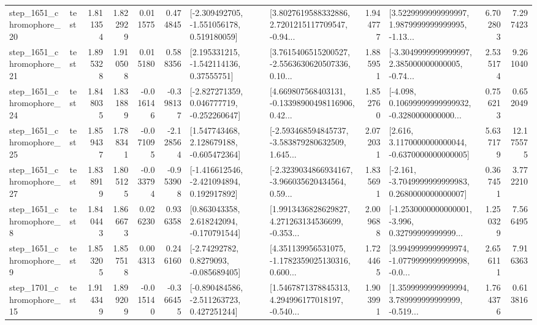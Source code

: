 \begin{tabular}{llrrrrllrlrr}
 step\_1651\_chromophore\_20 &      test &      1.811354 &    1.822929 &      0.011575 &  0.474845 &   [-2.309492705, -1.551056178, 0.519180059] &  [3.8027619588332886, 2.7201215117709547, -0.94... &       1.944777 &  [3.5229999999999997, 1.9879999999999995, -1.13... &            6.702803 &          7.297423 \\
 step\_1651\_chromophore\_21 &      test &      1.895328 &    1.910508 &      0.015180 &  0.588356 &     [2.195331215, -1.542114136, 0.37555751] &  [3.7615406515200527, -2.5563630620507336, 0.10... &       1.885951 &  [-3.3049999999999997, 2.385000000000005, -0.74... &            2.535174 &          9.261040 \\
 step\_1651\_chromophore\_24 &      test &      1.848035 &    1.831889 &     -0.016146 & -0.398137 &   [-2.827271359, 0.046777719, -0.252260647] &  [4.669807568403131, -0.13398900498116906, 0.42... &       1.852760 &  [-4.098, 0.10699999999999932, -0.3280000000000... &            0.756213 &          0.652049 \\
 step\_1651\_chromophore\_25 &      test &      1.859437 &    1.788341 &     -0.071095 & -2.128564 &    [1.547743468, 2.128679188, -0.605472364] &  [-2.593468594845737, -3.583879280632509, 1.645... &       2.072031 &   [2.616, 3.1170000000000044, -0.6370000000000005] &            5.637179 &         12.175575 \\
 step\_1651\_chromophore\_27 &      test &      1.838919 &    1.805125 &     -0.033794 & -0.953908 &   [-1.416612546, -2.421094894, 0.192917892] &  [-2.3239034866934167, -3.966035620434564, 0.59... &       1.835691 &  [-2.161, -3.7049999999999983, 0.2680000000000007] &            0.367451 &          3.772210 \\
  step\_1651\_chromophore\_8 &      test &      1.840443 &    1.866673 &      0.026230 &  0.936358 &    [0.863043358, 2.618242094, -0.170791544] &  [1.9913436828629827, 4.271263134536699, -0.353... &       2.009688 &  [-1.2530000000000001, -3.996, 0.32799999999999... &            1.250329 &          7.566495 \\
  step\_1651\_chromophore\_9 &      test &      1.853205 &    1.857518 &      0.004313 &  0.246160 &      [-2.74292782, 0.8279093, -0.085689405] &  [4.351139956531075, -1.1782359025130316, 0.600... &       1.724465 &  [3.9949999999999974, -1.0779999999999998, -0.0... &            2.656111 &          7.916363 \\
 step\_1701\_chromophore\_15 &      test &      1.914349 &    1.899209 &     -0.015140 & -0.366455 &   [-0.890484586, -2.511263723, 0.427251244] &  [1.5467871378845313, 4.294996177018197, -0.540... &       1.903991 &  [1.3599999999999994, 3.789999999999999, -0.519... &            1.764376 &          0.613816 \\

\end{tabular}
